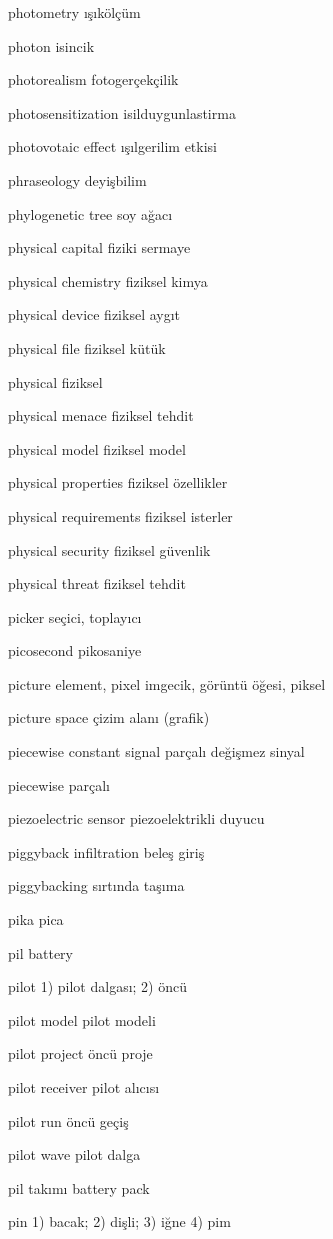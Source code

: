 \documentclass[12pt,fleqn]{article}\usepackage{../../common}
\begin{document}
photometry ışıkölçüm

photon isincik

photorealism fotogerçekçilik

photosensitization isilduygunlastirma

photovotaic effect ışılgerilim etkisi

phraseology deyişbilim

phylogenetic tree soy ağacı

physical capital fiziki sermaye

physical chemistry fiziksel kimya

physical device fiziksel aygıt

physical file fiziksel kütük

physical fiziksel

physical menace fiziksel tehdit

physical model fiziksel model

physical properties fiziksel özellikler

physical requirements fiziksel isterler

physical security fiziksel güvenlik

physical threat fiziksel tehdit

picker seçici, toplayıcı

picosecond pikosaniye

picture element, pixel imgecik, görüntü öğesi, piksel

picture space çizim alanı (grafik)

piecewise constant signal parçalı değişmez sinyal

piecewise parçalı

piezoelectric sensor piezoelektrikli duyucu

piggyback infiltration beleş giriş

piggybacking sırtında taşıma

pika pica

pil battery

pilot 1) pilot dalgası; 2) öncü

pilot model pilot modeli

pilot project öncü proje

pilot receiver pilot alıcısı

pilot run öncü geçiş

pilot wave pilot dalga

pil takımı battery pack

pin 1) bacak; 2) dişli; 3) iğne 4) pim
\end{document}
